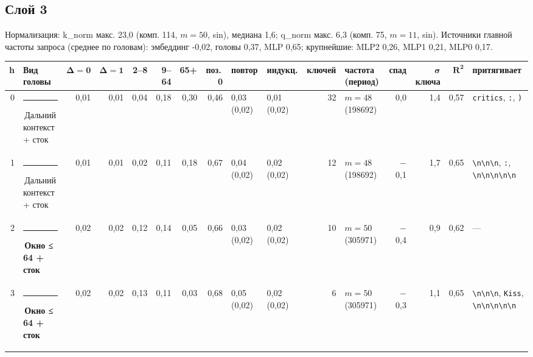 \documentclass[10pt]{article}
\begin{document}
\noindent\begin{minipage}{\linewidth}
\subsection*{Слой 3}
{\small\color{ink2} Нормализация: k\_norm макс. 23,0 (комп. 114, $m{=}50$, sin), медиана 1,6; q\_norm макс. 6,3 (комп. 75, $m{=}11$, sin). Источники главной частоты запроса (среднее по головам): эмбеддинг -0,02, головы 0,37, MLP 0,65; крупнейшие: MLP2 0,26, MLP1 0,21, MLP0 0,17.}
\begin{center}{\footnotesize\begin{tabular}{|r|l|r|r|r|r|r|r|l|l|r|l|r|r|r|l|}
\hline
\rowcolor{head}\textbf{h} & \textbf{Вид головы} & $\boldsymbol{\Delta{=}0}$ & $\boldsymbol{\Delta{=}1}$ & \textbf{2–8} & \textbf{9–64} & \textbf{65+} & \textbf{поз.\,0} & \textbf{повтор} & \textbf{индукц.} & \textbf{ключей} & \textbf{частота (период)} & \textbf{спад} & $\boldsymbol{\sigma}$ \textbf{ключа} & $\boldsymbol{R^2}$ & \textbf{притягивает} \\ \hline
0 & \textcolor[HTML]{C3C2B7}{\rule{0.62em}{0.62em}}\,Дальний контекст + сток & 0,01 & 0,01 & 0,04 & 0,18 & 0,30 & 0,46 & 0,03 (0,02) & 0,01 (0,02) & 32 & $m{=}48$ (198692) & 0,0 & 1,4 & 0,57 & \texttt{\textvisiblespace{}critics}, \texttt{\textvisiblespace{}:}, \texttt{\textvisiblespace{})} \\ \hline
1 & \textcolor[HTML]{C3C2B7}{\rule{0.62em}{0.62em}}\,Дальний контекст + сток & 0,01 & 0,01 & 0,02 & 0,11 & 0,18 & 0,67 & 0,04 (0,02) & 0,02 (0,02) & 12 & $m{=}48$ (198692) & $-$0,1 & 1,7 & 0,65 & \texttt{\textvisiblespace{}\textbackslash{}n\textbackslash{}n\textbackslash{}n}, \texttt{\textvisiblespace{}:}, \texttt{\textvisiblespace{}\textbackslash{}n\textbackslash{}n\textbackslash{}n\textbackslash{}n\textbackslash{}n} \\ \hline
2 & \textcolor[HTML]{EDA100}{\rule{0.62em}{0.62em}}\,\textbf{Окно ≤ 64 + сток} & 0,02 & 0,02 & 0,12 & 0,14 & 0,05 & 0,66 & 0,03 (0,02) & 0,02 (0,02) & 10 & $m{=}50$ (305971) & $-$0,4 & 0,9 & 0,62 & — \\ \hline
3 & \textcolor[HTML]{EDA100}{\rule{0.62em}{0.62em}}\,\textbf{Окно ≤ 64 + сток} & 0,02 & 0,02 & 0,13 & 0,11 & 0,03 & 0,68 & 0,05 (0,02) & 0,02 (0,02) & 6 & $m{=}50$ (305971) & $-$0,3 & 1,1 & 0,65 & \texttt{\textvisiblespace{}\textbackslash{}n\textbackslash{}n\textbackslash{}n}, \texttt{\textvisiblespace{}Kiss}, \texttt{\textvisiblespace{}\textbackslash{}n\textbackslash{}n\textbackslash{}n\textbackslash{}n\textbackslash{}n} \\ \hline

\end{tabular}}
\end{center}
\end{minipage}
\end{document}
